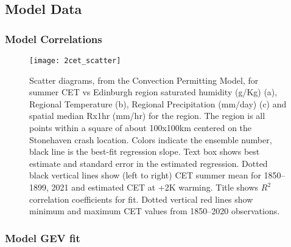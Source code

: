 \subsection{Model Data}\label{subsec:modelcorr}

\subsubsection{Model Correlations}

\begin{figure}[H]
    \centering
    \texttt{[image: 2cet\_scatter]}
    \caption{Scatter diagrams, from the Convection Permitting Model,
        for summer CET vs Edinburgh region saturated humidity (g/Kg) (a),
        Regional Temperature (b),
        Regional  Precipitation (mm/day) (c) and
        spatial median Rx1hr (mm/hr) for the region.
    The region is all points within a square of about 100x100km centered on the Stonehaven crash location.
    Colors indicate the ensemble number, black line is the best-fit regression slope.
    Text box shows best estimate and standard error in the estimated regression.
    Dotted black vertical lines show (left to right) CET summer mean for 1850--1899, 2021 and estimated CET at +2K warming.
    Title shows $R^2$ correlation coefficients for fit.
    Dotted vertical red lines show minimum and maximum CET values from 1850--2020 observations.}
    \label{fig:2cet_scatter}
\end{figure}

\subsubsection{Model GEV fit}

